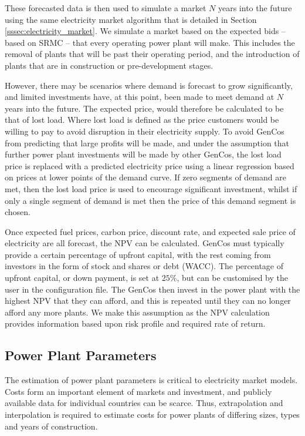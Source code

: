 These forecasted data is then used to simulate a market $N$ years into the future using the same electricity market algorithm that is detailed in Section \ref{sssec:electricity_market}. We simulate a market based on the expected bids -- based on SRMC -- that every operating power plant will make. This includes the removal of plants that will be past their operating period, and the introduction of plants that are in construction or pre-development stages. 

However, there may be scenarios where demand is forecast to grow significantly, and limited investments have, at this point, been made to meet demand at $N$ years into the future. The expected price, would therefore be calculated to be that of lost load. Where lost load is defined as the price customers would be willing to pay to avoid disruption in their electricity supply. To avoid GenCos from predicting that large profits will be made, and under the assumption that further power plant investments will be made by other GenCos, the lost load price is replaced with a predicted electricity price using a linear regression based on prices at lower points of the demand curve. If zero segments of demand are met, then the lost load price is used to encourage significant investment, whilst if only a single segment of demand is met then the price of this demand segment is chosen.

Once expected fuel prices, carbon price, discount rate, and expected sale price of electricity are all forecast, the NPV can be calculated. GenCos must typically provide a certain percentage of upfront capital, with the rest coming from investors in the form of stock and shares or debt (WACC). The percentage of upfront capital, or down payment, is set at $25\%$, but can be customised by the user in the configuration file. The GenCos then invest in the power plant with the highest NPV that they can afford, and this is repeated until they can no longer afford any more plants. We make this assumption as the NPV calculation provides information based upon risk profile and required rate of return.

\subsection{Power Plant Parameters}



The estimation of power plant parameters is critical to electricity market models. Costs form an important element of markets and investment, and publicly available data for individual countries can be scarce. Thus, extrapolation and interpolation is required to estimate costs for power plants of differing sizes, types and years of construction.


